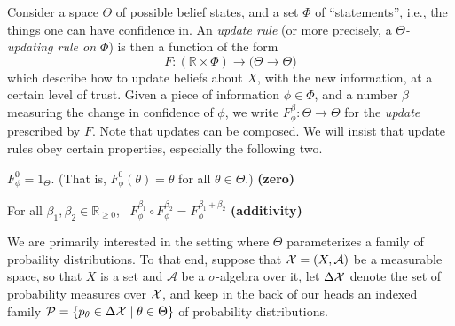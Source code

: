 \documentclass{article}
\begin{document}
Consider a space $\Theta$
of possible belief states,
and a set $\Phi$ of ``statements'', i.e., the things one can have confidence in.
An \emph{update rule} (or more precisely, a \emph{$\Theta$-updating rule on $\Phi$})
is then a function of the form
\[
    F :  (\mathbb R \times \Phi) \to \Big( \Theta \to \Theta \Big)
\]
which describe how to update beliefs about $X$, with the new information, at a certain level of trust.
Given a piece of information $\phi \in \Phi$, and a number $\beta$ measuring the change in confidence of $\phi$, we write
$F^\beta_\phi : \Theta \to \Theta$
for the \emph{update} prescribed by $F$.
Note that updates can be composed.
We will insist that update rules obey certain properties, especially the following two.
\begin{URaxioms}
    \item  $F^{0}_\phi  = 1_{\Theta}$.
        (That is, $F^{0}_\phi(\theta) = \theta$ for all $\theta \in \Theta$.)
        \hfill \textbf{(zero)} \label{ax:zero}
    \item For all $\beta_1, \beta_2 \in \mathbb R_{\ge 0}$,~
        $F^{\beta_1}_\phi \circ F^{\beta_2}_\phi = F^{\beta_1 + \beta_2}_\phi$
        \hfill \textbf{(additivity)} \label{ax:additivity}
\end{URaxioms}


We are primarily interested in the setting where $\Theta$ parameterizes a family of probaility distributions.
To that end, suppose that $\mathcal X = (X, \mathcal A)$ be a measurable space, so that $X$ is a set and $\mathcal A$ be a $\sigma$-algebra over it, let $\Delta \mathcal X$ denote the set of probability measures over $\mathcal X$,
and keep in the back of our heads an indexed family
$
    \mathcal P =
    \{ p_\theta \in\Delta\mathcal X \mid \theta \in \Theta \}
$ of probability distributions.

%
\end{document}
